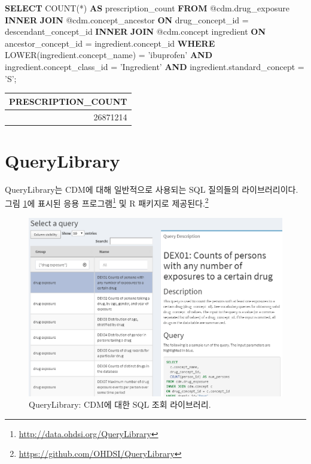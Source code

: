 \documentclass[11pt]{book}
\newenvironment{Shaded}{\begin{snugshade}}{\end{snugshade}}
\newcommand{\KeywordTok}[1]{\textcolor[rgb]{0.13,0.29,0.53}{\textbf{#1}}}
\newcommand{\StringTok}[1]{\textcolor[rgb]{0.31,0.60,0.02}{#1}}
\newcommand{\FunctionTok}[1]{\textcolor[rgb]{0.00,0.00,0.00}{#1}}
\newcommand{\NormalTok}[1]{#1}
\let\rmarkdownfootnote\footnote%
\def\footnote{\protect\rmarkdownfootnote}
\theoremstyle{definition}
\theoremstyle{definition}
\theoremstyle{definition}
\theoremstyle{remark}
\begin{document}
\begin{Shaded}
\begin{Highlighting}[]
\KeywordTok{SELECT} \FunctionTok{COUNT}\NormalTok{(*) }\KeywordTok{AS}\NormalTok{ prescription_count}
\KeywordTok{FROM}\NormalTok{ @cdm.drug_exposure}
\KeywordTok{INNER} \KeywordTok{JOIN}\NormalTok{ @cdm.concept_ancestor}
  \KeywordTok{ON}\NormalTok{ drug_concept_id = descendant_concept_id}
\KeywordTok{INNER} \KeywordTok{JOIN}\NormalTok{ @cdm.concept ingredient}
  \KeywordTok{ON}\NormalTok{ ancestor_concept_id = ingredient.concept_id}
\KeywordTok{WHERE} \FunctionTok{LOWER}\NormalTok{(ingredient.concept_name) = }\StringTok{'ibuprofen'}
  \KeywordTok{AND}\NormalTok{ ingredient.concept_class_id = }\StringTok{'Ingredient'}
  \KeywordTok{AND}\NormalTok{ ingredient.standard_concept = }\StringTok{'S'}\NormalTok{;}
\end{Highlighting}
\end{Shaded}

\begin{longtable}[]{@{}r@{}}
\toprule
PRESCRIPTION\_COUNT\tabularnewline
\midrule
\endhead
26871214\tabularnewline
\bottomrule
\end{longtable}

\section{QueryLibrary}\label{querylibrary}


QueryLibrary는 CDM에 대해 일반적으로 사용되는 SQL 질의들의
라이브러리이다. 그림 \ref{fig:queryLibrary}에 표시된 응용
프로그램\footnote{\url{http://data.ohdsi.org/QueryLibrary}} 및 R
패키지로 제공된다.\footnote{\url{https://github.com/OHDSI/QueryLibrary}}

\begin{figure}

{\centering \includegraphics[width=1\linewidth]{images/SqlAndR/queryLibrary} 

}

\caption{QueryLibrary: CDM에 대한 SQL 조회 라이브러리.}\label{fig:queryLibrary}
\end{figure}
\end{document}
